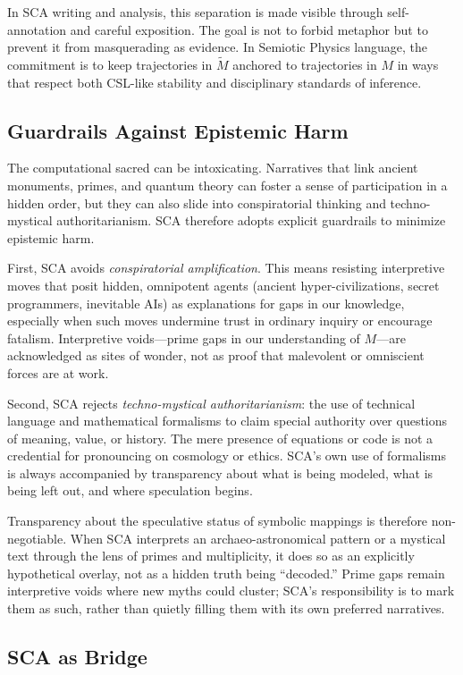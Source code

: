 \documentclass[12]{amsart}
\theoremstyle{plain}
\begin{document}
In SCA writing and analysis, this separation is made visible through self-annotation and careful exposition. The goal is not to forbid metaphor but to prevent it from masquerading as evidence. In Semiotic Physics language, the commitment is to keep trajectories in $\tilde M$ anchored to trajectories in $M$ in ways that respect both CSL-like stability and disciplinary standards of inference.

\subsection{Guardrails Against Epistemic Harm}

The computational sacred can be intoxicating. Narratives that link ancient monuments, primes, and quantum theory can foster a sense of participation in a hidden order, but they can also slide into conspiratorial thinking and techno-mystical authoritarianism. SCA therefore adopts explicit guardrails to minimize epistemic harm.

First, SCA avoids \emph{conspiratorial amplification}. This means resisting interpretive moves that posit hidden, omnipotent agents (ancient hyper-civilizations, secret programmers, inevitable AIs) as explanations for gaps in our knowledge, especially when such moves undermine trust in ordinary inquiry or encourage fatalism. Interpretive voids—prime gaps in our understanding of $M$—are acknowledged as sites of wonder, not as proof that malevolent or omniscient forces are at work.

Second, SCA rejects \emph{techno-mystical authoritarianism}: the use of technical language and mathematical formalisms to claim special authority over questions of meaning, value, or history. The mere presence of equations or code is not a credential for pronouncing on cosmology or ethics. SCA's own use of formalisms is always accompanied by transparency about what is being modeled, what is being left out, and where speculation begins.

Transparency about the speculative status of symbolic mappings is therefore non-negotiable. When SCA interprets an archaeo-astronomical pattern or a mystical text through the lens of primes and multiplicity, it does so as an explicitly hypothetical overlay, not as a hidden truth being ``decoded.'' Prime gaps remain interpretive voids where new myths could cluster; SCA's responsibility is to mark them as such, rather than quietly filling them with its own preferred narratives.

\subsection{SCA as Bridge}
\end{document}

